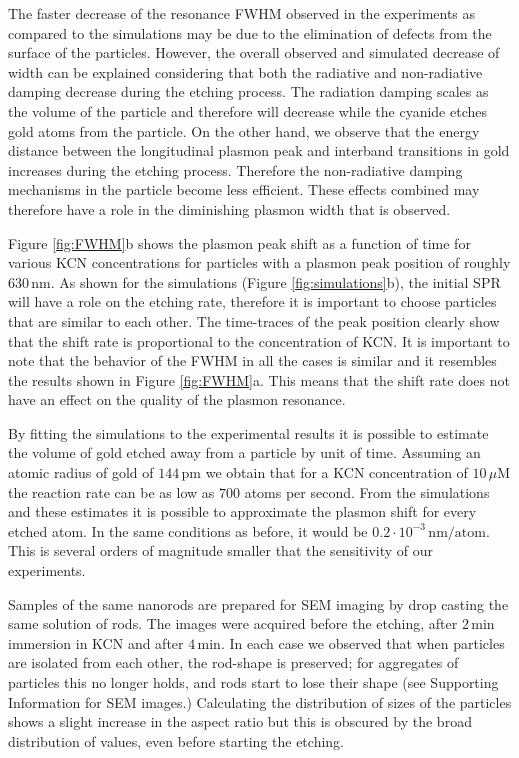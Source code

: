 \documentclass[a4paper,oneside,onecolumn]{article}
\newcommand{\nm}{\ensuremath{\,\textrm{nm}}}
\newcommand{\uM}{\ensuremath{\,\mu\textrm{M}}}
\begin{document}
The faster decrease of the resonance FWHM observed in the experiments as
compared to the simulations may be due to the elimination of defects from the
surface of the particles. However, the overall observed and simulated decrease
of width can be explained considering that both the radiative and non-radiative
damping decrease during the etching process. The radiation damping scales as the
volume of the particle\cite{Wokaun1982} and therefore will decrease while the
cyanide etches gold atoms from the particle.
On the other hand, we observe that the energy distance between the longitudinal
plasmon peak and interband transitions in gold increases during the etching
process. Therefore the non-radiative damping mechanisms in the particle become
less efficient\cite{Sonnichsen2002}. These effects combined may therefore have a
role in the diminishing plasmon width that is observed.

Figure \ref{fig:FWHM}b shows the plasmon peak shift as a function of time for
various KCN concentrations for particles with a plasmon peak position of
roughly $630\nm$. As shown for the simulations (Figure
\ref{fig:simulations}b), the initial SPR will have a role on the etching rate,
therefore it is important to choose particles that are similar to each other.
The time-traces of the peak position clearly show that the shift rate is
proportional to the concentration of KCN. It is important to note that the
behavior of the FWHM in all the cases is similar and it resembles the results
shown in Figure \ref{fig:FWHM}a. This means that the shift rate does not have an
effect on the quality of the plasmon resonance.

By fitting the simulations to the experimental results it is possible to
estimate the volume of gold etched away from a particle by unit of time.
Assuming an atomic radius of gold of $144\,\textrm{pm}$\cite{Pauling1947} we
obtain that for a KCN concentration of $10\uM$ the reaction rate can be as low
as $700$ atoms per second. From the simulations and these estimates it is
possible to approximate the plasmon shift for every etched atom. In the same
conditions as before, it would be $0.2\cdot 10^{-3}\, \textrm{nm}/
\textrm{atom}$. This is several orders of magnitude smaller that the sensitivity
of our experiments. 

Samples of the same nanorods are prepared for SEM imaging by drop casting the
same solution of rods. The images were acquired before the etching, after
$2\,\textrm{min}$ immersion in KCN and after $4\,\textrm{min}$. In each case we
observed that when particles are isolated from each other, the rod-shape is
preserved; for aggregates of particles this no longer holds, and rods start to
lose their shape (see Supporting Information for SEM images.) Calculating the
distribution of sizes of the particles shows a slight increase in the aspect
ratio but this is obscured by the broad distribution of values, even before
starting the etching.
\end{document}
